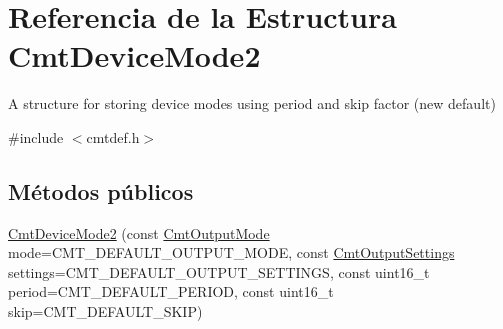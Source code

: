 \hypertarget{structCmtDeviceMode2}{\section{\-Referencia de la \-Estructura \-Cmt\-Device\-Mode2}
\label{structCmtDeviceMode2}
}


\-A structure for storing device modes using period and skip factor (new default)  




{\ttfamily \#include $<$cmtdef.\-h$>$}

\subsection*{\-Métodos públicos}
\begin{DoxyCompactItemize}
\item 
\hypertarget{structCmtDeviceMode2_a61b57b721b3a74ca319e2825a2247c93}{\hyperlink{structCmtDeviceMode2_a61b57b721b3a74ca319e2825a2247c93}{\-Cmt\-Device\-Mode2} (const \hyperlink{cmtdef_8h_a85df1cdea0bf11e38292e3cd5d69e747}{\-Cmt\-Output\-Mode} mode=\-C\-M\-T\-\_\-\-D\-E\-F\-A\-U\-L\-T\-\_\-\-O\-U\-T\-P\-U\-T\-\_\-\-M\-O\-D\-E, const \hyperlink{cmtdef_8h_a4125efede0d0948ee49291165a1d089b}{\-Cmt\-Output\-Settings} settings=\-C\-M\-T\-\_\-\-D\-E\-F\-A\-U\-L\-T\-\_\-\-O\-U\-T\-P\-U\-T\-\_\-\-S\-E\-T\-T\-I\-N\-G\-S, const uint16\-\_\-t period=\-C\-M\-T\-\_\-\-D\-E\-F\-A\-U\-L\-T\-\_\-\-P\-E\-R\-I\-O\-D, const uint16\-\_\-t skip=\-C\-M\-T\-\_\-\-D\-E\-F\-A\-U\-L\-T\-\_\-\-S\-K\-I\-P)}\label{structCmtDeviceMode2_a61b57b721b3a74ca319e2825a2247c93}


\end{DoxyCompactItemize}
